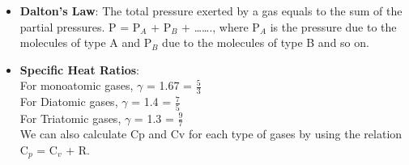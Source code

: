 \begin{itemize}
    \item \textbf{Dalton’s Law}: The total pressure exerted by a gas equals to the sum of the partial pressures.  P = P$_A$ + P$_B$ + ……., where P$_A$ is the pressure due to the molecules of type A and P$_B$ due to the molecules of type B and so on.  
    
    \item \textbf{Specific Heat Ratios}: \\	For monoatomic gases, $\gamma$ = 1.67 = $\frac{5}{3}$ \\For Diatomic gases, $\gamma$ = 1.4 = $\frac{7}{5}$ \\For Triatomic gases, $\gamma$ = 1.3 = $\frac{9}{7}$   \\We can also calculate Cp and Cv for each type of gases by using the relation C$_p$ = C$_v$ + R. 

\end{itemize}


